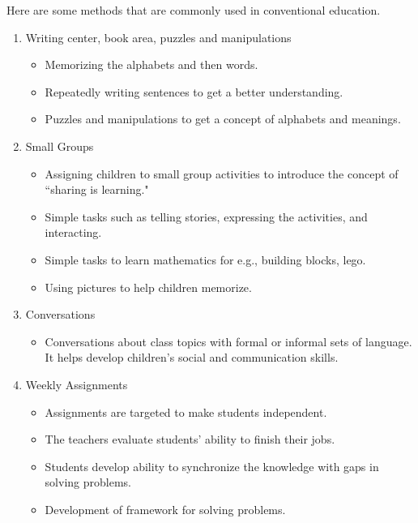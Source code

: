 Here are some methods that are commonly used in conventional education.
\begin{enumerate}

\item Writing center, book area, puzzles and manipulations

\begin{itemize}
\item Memorizing the alphabets and then words.

\item  Repeatedly writing sentences to get a better understanding.

\item Puzzles and manipulations to get a concept of alphabets and meanings.


\end{itemize}



\item Small Groups

\begin{itemize}
\item Assigning children to small group activities to introduce the concept of “sharing is learning." 

\item Simple tasks such as telling stories, expressing the activities, and interacting.

\item Simple tasks to learn mathematics for e.g., building blocks, lego.

\item Using pictures to help children memorize.

\end{itemize}

\item Conversations

\begin{itemize}
\item Conversations about class topics with formal or informal sets of language. It helps develop children's social  and communication skills.


\end{itemize}

\item Weekly Assignments
\begin{itemize}
\item Assignments are targeted to make students independent. 
\item The teachers evaluate students' ability to finish their jobs.
\item Students develop ability to synchronize the knowledge with gaps in solving problems.
\item Development of framework for solving problems.



\end{itemize}
\end{enumerate}
